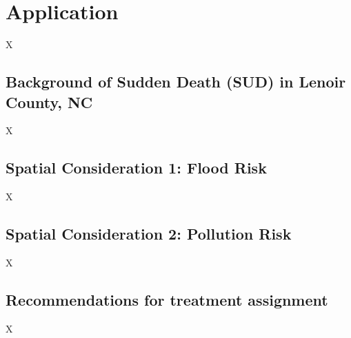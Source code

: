 \documentclass[11pt]{article}
\begin{document}
\setcounter{section}{3} %

\section{Application}

X

\subsection{Background of Sudden Death (SUD) in Lenoir County, NC}

X

\subsection{Spatial Consideration 1: Flood Risk}

X

\subsection{Spatial Consideration 2: Pollution Risk}

X

\subsection{Recommendations for treatment assignment}

X
\end{document}
